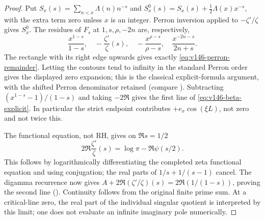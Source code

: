 \begin{proof}
Put $S_x(s)=\sum_{n<x}\Lambda(n)n^{-s}$ and
$S_x^0(s)=S_x(s)+\tfrac12\Lambda(x)x^{-s}$, with the extra term zero
unless $x$ is an integer. Perron inversion applied to $-\zeta'/\zeta$
gives $S_x^0$. The residues of $F_s$ at $1,s,\rho,-2n$ are,
respectively,
\[
 \frac{x^{1-s}}{1-s},\quad-\frac{\zeta'}\zeta(s),\quad
 -\frac{x^{\rho-s}}{\rho-s},\quad\frac{x^{-2n-s}}{2n+s}.
\]
The rectangle with its right edge upwards gives exactly
\eqref{eq:v146-perron-remainder}. Letting the contours tend to infinity
in the standard Perron order gives the displayed zero expansion;
this is the classical explicit-formula argument, with the shifted
Perron denominator retained (compare \cite{HarperZetaNotes}).
Subtracting $(x^{1-s}-1)/(1-s)$ and taking $-2\Re$ gives the first
line of \eqref{eq:v146-beta-explicit}. In particular the strict
endpoint contributes $+e_x\cos(\xi L)$, not zero and not twice this.

The functional equation, not RH, gives on $\Re s=1/2$
\[
 2\Re\frac{\zeta'}\zeta(s)=\log\pi-\Re\psi(s/2).
\]
This follows by logarithmically differentiating the completed zeta
functional equation and using conjugation; the real parts of
$1/s+1/(s-1)$ cancel. The digamma recurrence now gives
$A+2\Re(\zeta'/\zeta)(s)=2\Re(1/(1-s))$, proving the second line
(\cite{DLMFZetaReflection}). Continuity follows from the original
finite prime sum. At a critical-line zero, the real part of the
individual singular quotient is interpreted by this limit; one does
not evaluate an infinite imaginary pole numerically.
\end{proof}


